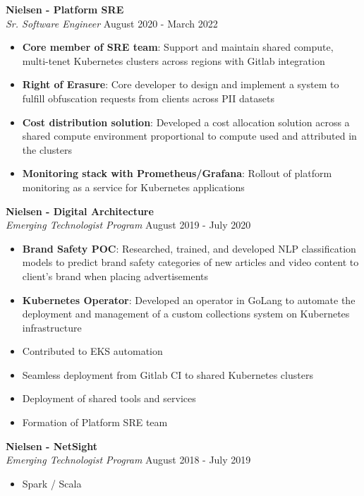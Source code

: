 \documentclass[a4paper]{article}
\begin{document}
\textbf{Nielsen - Platform SRE}\\
\textit{Sr. Software Engineer} \hfill August 2020 - March 2022\\
\vspace{-1mm}
\begin{itemize} \itemsep 1pt
    \item \textbf{Core member of SRE team}: Support and maintain shared compute, multi-tenet Kubernetes clusters across regions with Gitlab integration
    \item \textbf{Right of Erasure}: Core developer to design and implement a system to fulfill obfuscation requests from clients across PII datasets
    \item \textbf{Cost distribution solution}: Developed a cost allocation solution across a shared compute environment proportional to compute used and attributed in the clusters
    \item \textbf{Monitoring stack with Prometheus/Grafana}: Rollout of platform monitoring as a service for Kubernetes applications
\end{itemize}
\textbf{Nielsen - Digital Architecture}\\
\textit{Emerging Technologist Program} \hfill August 2019 - July 2020\\
\vspace{-1mm}
\begin{itemize} \itemsep 1pt
	\item \textbf{Brand Safety POC}: Researched, trained, and developed NLP classification models to predict brand safety categories of new articles and video content to client's brand when placing advertisements
    \item \textbf{Kubernetes Operator}: Developed an operator in GoLang to automate the deployment and management of a custom collections system on Kubernetes infrastructure
    \item Contributed to EKS automation
	\item Seamless deployment from Gitlab CI to shared Kubernetes clusters
	\item Deployment of shared tools and services
	\item Formation of Platform SRE team
\end{itemize}
\textbf{Nielsen - NetSight}\\
\textit{Emerging Technologist Program} \hfill August 2018 - July 2019\\
\vspace{-1mm}
\begin{itemize} \itemsep 1pt
	\item Spark / Scala
\end{itemize}
\end{document}
